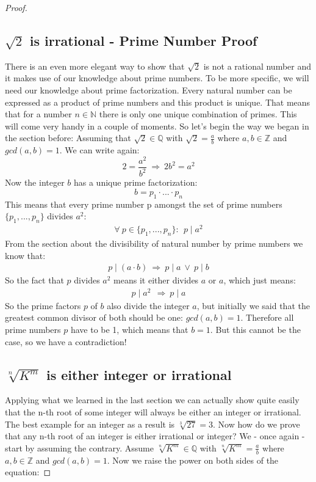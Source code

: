 \documentclass{article}
\theoremstyle{definition}
\begin{document}
\begin{proof}
\subsection{$\sqrt{2}$ is irrational - Prime Number Proof}
There is an even more elegant way to show that $\sqrt{2}$ is not a rational number and it makes use of our knowledge about prime numbers. To be more specific, we will need our knowledge about prime factorization. Every natural number can be expressed as a product of prime numbers and this product is unique. That means that for a number $n \in \mathbb{N}$ there is only one unique combination of primes. This will come very handy in a couple of moments.
\newline
So let's begin the way we began in the section before: Assuming that $\sqrt{2}\in \mathbb{Q}$ with $\sqrt{2} =\frac{a}{b}$ where $a,b \in \mathbb{Z}$ and $gcd(a,b) = 1$. We can write again:
\begin{equation}
    2 = \frac{a^2}{b^2} \: \Rightarrow \: 2b^2 = a^2
\end{equation}
Now the integer $b$ has a unique prime factorization:
\begin{equation}
    b = p_1 \cdot ... \cdot p_n
\end{equation}
This means that every prime number p amongst the set of prime numbers $\{p_1,...,p_n\}$  divides $a^2$:
\begin{align}
    \forall \: p \in \{p_1,...,p_n\} : \: \: p \mid a^2
\end{align}
From the section about the divisibility of natural number by prime numbers we know that:
\begin{align}
   p \mid (a\cdot b)  \: \Rightarrow \: p\mid a \: \lor \: p\mid b 
\end{align}
So the fact that $p$ divides $a^2$ means it either divides $a$ or $a$, which just means:
\begin{align}
    p \mid a^2 \: \: \Rightarrow \: p\mid a
\end{align}
So the prime factors $p$ of $b$ also divide the integer $a$, but initially we said that the greatest common divisor of both should be one: $gcd(a,b)=1$. Therefore all prime numbers $p$ have to be 1, which means that $b=1$. But this cannot be the case, so we have a contradiction!
\newline
\newline 
\newline

\subsection{$\sqrt[n]{K^m}$ is either integer or irrational}
Applying what we learned in the last section we can actually show quite easily that the n-th root of some integer will always be either an integer or irrational. The best example for an integer as a result is $\sqrt[3]{27}=3$. Now how do we prove that any n-th root of an integer is either irrational or integer? We - once again - start by assuming the contrary.
\newline
Assume $\sqrt[n]{K^m} \in \mathbb{Q}$ with $\sqrt[n]{K^m} = \frac{a}{b}$ where $a,b \in \mathbb{Z}$ and $gcd(a,b)=1$. Now we raise the power on both sides of the equation:


\end{proof}
\end{document}
